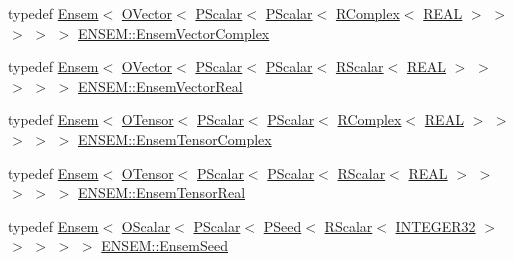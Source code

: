 \begin{DoxyCompactItemize}
\item 
typedef \mbox{\hyperlink{classENSEM_1_1Ensem}{Ensem}}$<$ \mbox{\hyperlink{classENSEM_1_1OVector}{O\+Vector}}$<$ \mbox{\hyperlink{classENSEM_1_1PScalar}{P\+Scalar}}$<$ \mbox{\hyperlink{classENSEM_1_1PScalar}{P\+Scalar}}$<$ \mbox{\hyperlink{classENSEM_1_1RComplex}{R\+Complex}}$<$ \mbox{\hyperlink{namespaceENSEM_a6dd9aa6508168f545c861787e63ddd1e}{R\+E\+AL}} $>$ $>$ $>$ $>$ $>$ \mbox{\hyperlink{group__defs_ga13b984332760feb8bc9c8f1071ade9ef}{E\+N\+S\+E\+M\+::\+Ensem\+Vector\+Complex}}
\item 
typedef \mbox{\hyperlink{classENSEM_1_1Ensem}{Ensem}}$<$ \mbox{\hyperlink{classENSEM_1_1OVector}{O\+Vector}}$<$ \mbox{\hyperlink{classENSEM_1_1PScalar}{P\+Scalar}}$<$ \mbox{\hyperlink{classENSEM_1_1PScalar}{P\+Scalar}}$<$ \mbox{\hyperlink{classENSEM_1_1RScalar}{R\+Scalar}}$<$ \mbox{\hyperlink{namespaceENSEM_a6dd9aa6508168f545c861787e63ddd1e}{R\+E\+AL}} $>$ $>$ $>$ $>$ $>$ \mbox{\hyperlink{group__defs_gaa5c6b9de066b629db579dd1b6a585299}{E\+N\+S\+E\+M\+::\+Ensem\+Vector\+Real}}
\item 
typedef \mbox{\hyperlink{classENSEM_1_1Ensem}{Ensem}}$<$ \mbox{\hyperlink{classENSEM_1_1OTensor}{O\+Tensor}}$<$ \mbox{\hyperlink{classENSEM_1_1PScalar}{P\+Scalar}}$<$ \mbox{\hyperlink{classENSEM_1_1PScalar}{P\+Scalar}}$<$ \mbox{\hyperlink{classENSEM_1_1RComplex}{R\+Complex}}$<$ \mbox{\hyperlink{namespaceENSEM_a6dd9aa6508168f545c861787e63ddd1e}{R\+E\+AL}} $>$ $>$ $>$ $>$ $>$ \mbox{\hyperlink{group__defs_ga3d22b4deb8e2322433882b290ff83364}{E\+N\+S\+E\+M\+::\+Ensem\+Tensor\+Complex}}
\item 
typedef \mbox{\hyperlink{classENSEM_1_1Ensem}{Ensem}}$<$ \mbox{\hyperlink{classENSEM_1_1OTensor}{O\+Tensor}}$<$ \mbox{\hyperlink{classENSEM_1_1PScalar}{P\+Scalar}}$<$ \mbox{\hyperlink{classENSEM_1_1PScalar}{P\+Scalar}}$<$ \mbox{\hyperlink{classENSEM_1_1RScalar}{R\+Scalar}}$<$ \mbox{\hyperlink{namespaceENSEM_a6dd9aa6508168f545c861787e63ddd1e}{R\+E\+AL}} $>$ $>$ $>$ $>$ $>$ \mbox{\hyperlink{group__defs_ga39dae87ed68ca227f7c9025a6e0a55b7}{E\+N\+S\+E\+M\+::\+Ensem\+Tensor\+Real}}
\item 
typedef \mbox{\hyperlink{classENSEM_1_1Ensem}{Ensem}}$<$ \mbox{\hyperlink{classENSEM_1_1OScalar}{O\+Scalar}}$<$ \mbox{\hyperlink{classENSEM_1_1PScalar}{P\+Scalar}}$<$ \mbox{\hyperlink{classENSEM_1_1PSeed}{P\+Seed}}$<$ \mbox{\hyperlink{classENSEM_1_1RScalar}{R\+Scalar}}$<$ \mbox{\hyperlink{namespaceENSEM_a6a58e5c07422c48c5d547184b36719bf}{I\+N\+T\+E\+G\+E\+R32}} $>$ $>$ $>$ $>$ $>$ \mbox{\hyperlink{group__defs_ga698c2e3c5bf93dd51c61ca1234372463}{E\+N\+S\+E\+M\+::\+Ensem\+Seed}}

\end{DoxyCompactItemize}
